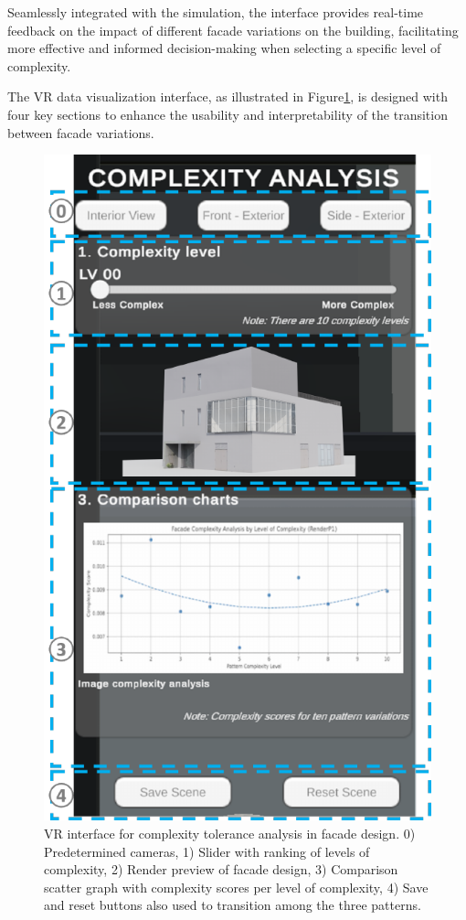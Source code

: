 Seamlessly integrated with the simulation, the interface provides real-time feedback on the impact of different facade variations on the building, facilitating more effective and informed decision-making when selecting a specific level of complexity.



The VR data visualization interface, as illustrated in Figure\ref{fig:VRInterface}, is designed with four key sections to enhance the usability and interpretability of the transition between facade variations.

     \begin{figure}[!htb]
          \centering
          \includegraphics[width= \linewidth]{Images/VRInterface}
          \caption{VR interface for complexity tolerance analysis in facade design. 0) Predetermined cameras, 1) Slider with ranking of levels of complexity, 2) Render preview of facade design, 3) Comparison scatter graph with complexity scores per level of complexity, 4) Save and reset buttons also used to transition among the three patterns.}
          \label{fig:VRInterface}
        \end{figure}

